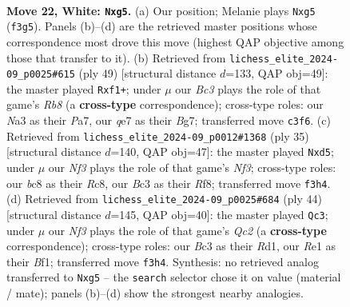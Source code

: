 \documentclass[11pt]{article}
\begin{document}
\clearpage

\begin{figure}[p]\centering
\begin{subfigure}{0.46\textwidth}\centering
\resizebox{\linewidth}{!}{%
\newchessgame
\chessboard[
  setfen={2b5/1p2qpkp/r4np1/p5r1/Pn6/NPB2NP1/5PBP/R3R1K1 w - - 0 22},
  showmover=false,
  pgfstyle=straightmove, color=movearrow, markmove={f3-g5}
]}
\caption{}
\end{subfigure}\hfill
\begin{subfigure}{0.46\textwidth}\centering
\resizebox{\linewidth}{!}{%
\newchessgame
\chessboard[
  setfen={1r4k1/p4pbp/2pp2p1/8/2P1N3/q1nPQ1P1/2R2PBP/1r3RK1 b - - 2 25},
  showmover=false,
  pgfstyle=straightmove, color=movearrow, markmove={b1-f1}
]}
\caption{}
\end{subfigure}
\\[4pt]
\begin{subfigure}{0.46\textwidth}\centering
\resizebox{\linewidth}{!}{%
\newchessgame
\chessboard[
  setfen={2r2rk1/1p2bppp/p1p2n2/3Q1p2/1P1P1B2/P3PN2/5PPP/1R1R2K1 b - - 0 18},
  showmover=false,
  pgfstyle=straightmove, color=movearrow, markmove={f6-d5}
]}
\caption{}
\end{subfigure}\hfill
\begin{subfigure}{0.46\textwidth}\centering
\resizebox{\linewidth}{!}{%
\newchessgame
\chessboard[
  setfen={6k1/pppr1p1p/1n4p1/3q1p2/1P1nr3/P4N1P/2Q2PP1/2RR1BK1 w - - 0 23},
  showmover=false,
  pgfstyle=straightmove, color=movearrow, markmove={c2-c3}
]}
\caption{}
\end{subfigure}
\caption{\textbf{Move 22, White: \texttt{Nxg5}.} (a) Our position; Melanie plays \texttt{Nxg5} (\texttt{f3g5}). Panels (b)--(d) are the retrieved master positions whose correspondence most drove this move (highest QAP objective among those that transfer to it). (b) Retrieved from \texttt{lichess\_elite\_2024-09\_p0025\#615} (ply 49) [structural distance $d$=133, QAP obj=49]: the master played \texttt{Rxf1+}; under $\mu$ our \emph{Bc3} plays the role of that game's \emph{Rb8} (a \textbf{cross-type} correspondence); cross-type roles: our \emph{N}a3 as their \emph{P}a7, our \emph{q}e7 as their \emph{B}g7; transferred move \texttt{c3f6}. (c) Retrieved from \texttt{lichess\_elite\_2024-09\_p0012\#1368} (ply 35) [structural distance $d$=140, QAP obj=47]: the master played \texttt{Nxd5}; under $\mu$ our \emph{Nf3} plays the role of that game's \emph{Nf3}; cross-type roles: our \emph{b}c8 as their \emph{R}c8, our \emph{B}c3 as their \emph{R}f8; transferred move \texttt{f3h4}. (d) Retrieved from \texttt{lichess\_elite\_2024-09\_p0025\#684} (ply 44) [structural distance $d$=145, QAP obj=40]: the master played \texttt{Qc3}; under $\mu$ our \emph{Nf3} plays the role of that game's \emph{Qc2} (a \textbf{cross-type} correspondence); cross-type roles: our \emph{B}c3 as their \emph{R}d1, our \emph{R}e1 as their \emph{B}f1; transferred move \texttt{f3h4}. Synthesis: no retrieved analog transferred to \texttt{Nxg5} -- the \texttt{search} selector chose it on value (material / mate); panels (b)--(d) show the strongest nearby analogies.}
\label{fig:thought-m42}
\end{figure}
\end{document}
